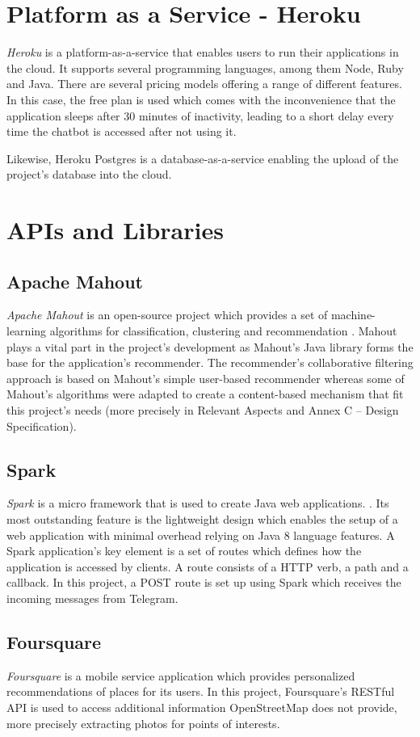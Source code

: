 \section{Platform as a Service - Heroku}
\textit{Heroku} \cite{heroku} is a platform-as-a-service that enables users to run their applications in the cloud. It supports several programming languages, among them Node, Ruby and Java. There are several pricing models offering a range of different features. In this case, the free plan is used which comes with the inconvenience that the application sleeps after 30 minutes of inactivity, leading to a short delay every time the chatbot is accessed after not using it.

Likewise, Heroku Postgres is a database-as-a-service enabling the upload of the project’s database into the cloud. 

\section{APIs and Libraries}
\subsection{Apache Mahout}
\textit{Apache Mahout} is an open-source project which provides a set of machine-learning algorithms for classification, clustering and recommendation \cite{mahout}. Mahout plays a vital part in the project’s development as Mahout’s Java library forms the base for the application’s recommender. The recommender’s collaborative filtering approach is based on Mahout’s simple user-based recommender \cite{mahout:userbased} whereas some of Mahout’s algorithms were adapted to create a content-based mechanism that fit this project’s needs (more precisely in Relevant Aspects and Annex C – Design Specification).

\subsection{Spark}
\textit{Spark} is a micro framework that is used to create Java web applications. \cite{spark}. Its most outstanding feature is the lightweight design which enables the setup of a web application with minimal overhead relying on Java 8 language features. A Spark application's key element is a set of routes which defines how the application is accessed by clients. A route consists of a HTTP verb, a path and a callback. In this project, a POST route is set up using Spark which receives the incoming messages from Telegram. 

\subsection{Foursquare}
\textit{Foursquare} \cite{foursquare} is a mobile service application which provides personalized recommendations of places for its users. In this project, Foursquare’s RESTful API is used to access additional information OpenStreetMap does not provide, more precisely extracting photos for points of interests.

